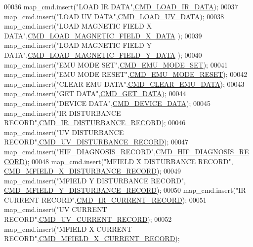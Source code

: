 \begin{DoxyCode}
00036     map\_cmd.insert(\textcolor{stringliteral}{"LOAD IR DATA"},\hyperlink{a00086_a8c7ce698ee79d20e30eb0ac08f0d9abc}{CMD\_LOAD\_IR\_DATA});
00037     map\_cmd.insert(\textcolor{stringliteral}{"LOAD UV DATA"},\hyperlink{a00086_a8904f57ef5850374dbcdbe67eb8a5543}{CMD\_LOAD\_UV\_DATA});
00038     map\_cmd.insert(\textcolor{stringliteral}{"LOAD MAGNETIC FIELD X DATA"},\hyperlink{a00086_a9e5d9d302e44daccbe233d321696b12c}{CMD\_LOAD\_MAGNETIC\_FIELD\_X\_DATA}
      );
00039     map\_cmd.insert(\textcolor{stringliteral}{"LOAD MAGNETIC FIELD Y DATA"},\hyperlink{a00086_ace011e2ba41b184650e8bd0ddbfa00d2}{CMD\_LOAD\_MAGNETIC\_FIELD\_Y\_DATA}
      );
00040     map\_cmd.insert(\textcolor{stringliteral}{"EMU MODE SET"},\hyperlink{a00086_ac80fdfdbada05f61256bef39c2064330}{CMD\_EMU\_MODE\_SET});
00041     map\_cmd.insert(\textcolor{stringliteral}{"EMU MODE RESET"},\hyperlink{a00086_a48532ee6ce8c4c41bc6a972f66998ca6}{CMD\_EMU\_MODE\_RESET});
00042     map\_cmd.insert(\textcolor{stringliteral}{"CLEAR EMU DATA"},\hyperlink{a00086_aa5f71f685588bc4e978cd6d595a5ea81}{CMD\_CLEAR\_EMU\_DATA});
00043     map\_cmd.insert(\textcolor{stringliteral}{"GET DATA"},\hyperlink{a00086_af89ae6f2252e558fc6e54ea9b452bf0e}{CMD\_GET\_DATA});
00044     map\_cmd.insert(\textcolor{stringliteral}{"DEVICE DATA"},\hyperlink{a00086_a4412fcb90fb9171d432a624428881e70}{CMD\_DEVICE\_DATA});
00045     map\_cmd.insert(\textcolor{stringliteral}{"IR DISTURBANCE RECORD"},\hyperlink{a00086_ad37cd290161f0a245d189c3f4e014d4e}{CMD\_IR\_DISTURBANCE\_RECORD});
00046     map\_cmd.insert(\textcolor{stringliteral}{"UV DISTURBANCE RECORD"},\hyperlink{a00086_ae45bb46748497c6a117beb1e93072d83}{CMD\_UV\_DISTURBANCE\_RECORD});
00047     map\_cmd.insert(\textcolor{stringliteral}{"HIF\_DIAGNOSIS\_RECORD"},\hyperlink{a00086_a185ed5442d69c7c8abba13323a8e8187}{CMD\_HIF\_DIAGNOSIS\_RECORD});
00048     map\_cmd.insert(\textcolor{stringliteral}{"MFIELD X  DISTURBANCE RECORD"},
      \hyperlink{a00086_ab84aea346a3f75b58f8bda67b8ae9be0}{CMD\_MFIELD\_X\_DISTURBANCE\_RECORD});
00049     map\_cmd.insert(\textcolor{stringliteral}{"MFIELD Y  DISTURBANCE RECORD"},
      \hyperlink{a00086_af77e9c0ad32b3cc50d61992d4b64a831}{CMD\_MFIELD\_Y\_DISTURBANCE\_RECORD});
00050     map\_cmd.insert(\textcolor{stringliteral}{"IR CURRENT RECORD"},\hyperlink{a00086_a4dcce4fd3ff29eb6782f3228901f99cf}{CMD\_IR\_CURRENT\_RECORD});
00051     map\_cmd.insert(\textcolor{stringliteral}{"UV CURRENT RECORD"},\hyperlink{a00086_ab0e0364ddc2d95d1e5b51a3e3ff50918}{CMD\_UV\_CURRENT\_RECORD});
00052     map\_cmd.insert(\textcolor{stringliteral}{"MFIELD X  CURRENT RECORD"},\hyperlink{a00086_ab796345ffdbc6a240b67b56583bb77c6}{CMD\_MFIELD\_X\_CURRENT\_RECORD});

\end{DoxyCode}
